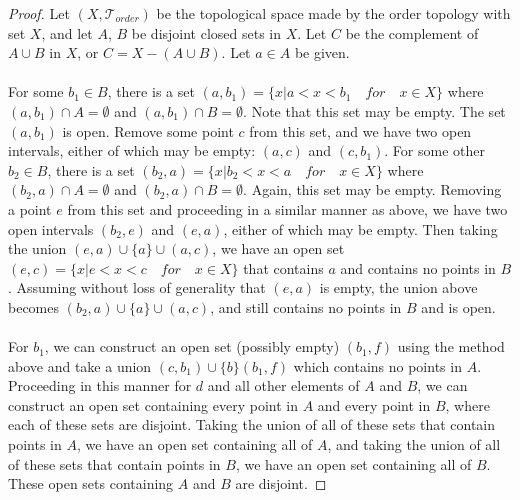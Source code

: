 \documentclass{article}
\begin{document}
\begin{proof}
  Let $(X, \mathcal{T}_{order})$ be the topological space made by the order topology with set $X$, and let 
  $A$, $B$ be disjoint closed sets in $X$.  Let $C$ be the complement of $A \cup B$ in $X$, or 
  $C = X - (A \cup B)$.  Let $a \in A$ be given.\\ 
  \\ 
  For some $b_1 \in B$, there is a set $(a, b_1) = \{x | a < x < b_1 \quad for \quad x \in X \}$ where $(a, b_1) \cap A = \emptyset$  
  and $(a, b_1) \cap B = \emptyset$.  Note that this set may be empty.  The set $(a, b_1)$ is open.  
  Remove some point $c$ from this set, and we have two open intervals, either of which may be empty: $(a, c)$ and $(c, b_1)$.   
  For some other $b_2 \in B$, there is a set $(b_2, a) = \{x | b_2 < x < a \quad for \quad x \in X \}$ where $(b_2, a) \cap A = \emptyset$ 
  and $(b_2, a) \cap B = \emptyset$.  Again, this set may be empty.  Removing a point $e$ from this set and proceeding in a similar manner as above, 
  we have two open intervals $(b_2, e)$ and $(e, a)$, either of which may be empty.  Then taking the union $(e, a) \cup \{a\} \cup (a, c)$, we 
  have an open set $(e, c) = \{ x | e < x < c \quad for \quad x \in X\}$ that contains $a$ and contains no points in $B$.  
  Assuming without loss of generality that $(e, a)$ is empty, the union above becomes $(b_2, a) \cup \{a\} \cup (a, c)$, and 
  still contains no points in $B$ and is open. \\ 
  \\
  For $b_1$, we can construct an open set (possibly empty) $(b_1, f)$ using the method above and take a union $(c, b_1) \cup \{b\} (b_1, f)$ 
  which contains no points in $A$.  Proceeding in this manner for $d$ and all other elements of $A$ and $B$, we can construct an open set 
  containing every point in $A$ and every point in $B$, where each of these sets are disjoint.  Taking the union of all of these sets that 
  contain points in $A$, we have an open set containing all of $A$, and taking the union of all of these sets that contain points in $B$, 
  we have an open set containing all of $B$.  These open sets containing $A$ and $B$ are disjoint.
\end{proof}
\end{document}
